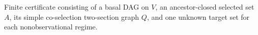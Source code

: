 Finite certificate consisting of a basal DAG on \(V\), an ancestor-closed selected set \(A\), its simple co-selection two-section graph \(Q\), and one unknown target set for each nonobservational regime.